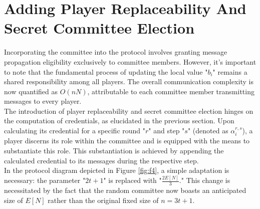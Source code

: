 \documentclass{report}
\begin{document}
\section{Adding Player Replaceability And Secret Committee Election}
Incorporating the committee into the protocol involves granting message propagation eligibility exclusively to committee members. However, it's important to note that the fundamental process of updating the local value "$b_{i}$" remains a shared responsibility among all players. The overall communication complexity is now quantified as $O(nN)$, attributable to each committee member transmitting messages to every player.\\
The introduction of player replaceability and secret committee election hinges on the computation of credentials, as elucidated in the previous section. Upon calculating its credential for a specific round "$r$" and step "$s$" (denoted as $\alpha_{i}^{r, s}$), a player discerns its role within the committee and is equipped with the means to substantiate this role. This substantiation is achieved by appending the calculated credential to its messages during the respective step.\\
In the protocol diagram depicted in Figure \ref{fig:f4}, a simple adaptation is necessary: the parameter "$2t + 1$" is replaced with "$\frac{2E[N]}{3}$." This change is necessitated by the fact that the random committee now boasts an anticipated size of $E[N]$ rather than the original fixed size of $n = 3t + 1$.
\end{document}
